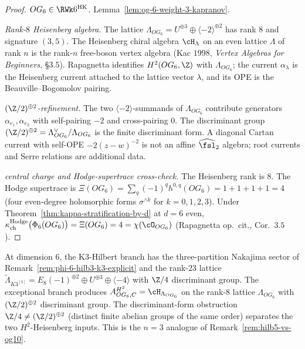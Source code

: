 \begin{proof}
\emph{\(OG_6\in\RWk6^{\mathrm{HK}}\).}
Lemma~\ref{lem:og-6-weight-3-kapranov}.

\emph{Rank-\(8\) Heisenberg algebra.}
The lattice $\Lambda_{OG_6} = U^{\oplus 3} \oplus
\langle -2\rangle^{\oplus 2}$ has rank $8$ and signature $(3, 5)$.
The Heisenberg chiral algebra $\cH_\Lambda$ on an even lattice
$\Lambda$ of rank $n$ is the rank-$n$ free-boson vertex algebra
\textup{(}Kac $1998$, \emph{Vertex Algebras for Beginners},
\S$3.5$\textup{).} Rapagnetta identifies \(H^2(OG_6,\Z)\) with
\(\Lambda_{OG_6}\); the current \(\alpha_\lambda\) is the Heisenberg
current attached to the lattice vector \(\lambda\), and its OPE is the
Beauville--Bogomolov pairing.

\emph{\((\Z/2)^{\oplus2}\)-refinement.}
The two $\langle -2\rangle$-summands of $\Lambda_{OG_6}$ contribute
generators $\alpha_{e_1}, \alpha_{e_2}$ with self-pairing $-2$ and
cross-pairing $0$. The discriminant group
$(\Z/2)^{\oplus 2} = \Lambda_{OG_6}^\vee / \Lambda_{OG_6}$ is the
finite discriminant form. A diagonal Cartan current with self-OPE
\(-2(z-w)^{-2}\) is not an affine \(\widehat{\fsl}_2\) algebra; root
currents and Serre relations are additional data.

\emph{central charge and Hodge-supertrace cross-check.}
The Heisenberg rank is \(8\). The Hodge supertrace is
$\Xi(OG_6) = \sum_q (-1)^q h^{0,q}(OG_6) = 1 + 1 + 1 + 1 = 4$
\textup{(}four even-degree holomorphic forms $\sigma^{\wedge k}$ for
$k = 0, 1, 2, 3$\textup{).} Under
Theorem~\ref{thm:kappa-stratification-by-d} at $d = 6$ even,
$\kappa_{\mathrm{ch}}^{\mathrm{Hodge}}\bigl(\Phi_6(OG_6)\bigr) = \Xi(OG_6) = 4 =
\chi(\cO_{OG_6})$ \textup{(}Rapagnetta op.\ cit., Cor.~$3.5$\textup{).}
\end{proof}

\begin{remark}
\label{rem:og6-vs-hilb3-k3}
%
At dimension \(6\), the K$3$-Hilbert branch has the three-partition
Nakajima sector of Remark~\ref{rem:phi-6-hilb3-k3-explicit} and the
rank-\(23\) lattice
$\widetilde\Lambda_{K3^{[3]}} = E_8(-1)^{\oplus 2} \oplus U^{\oplus 3}
\oplus \langle -4\rangle$ with $\Z/4$ discriminant group. The
exceptional branch produces
$A^{H^2}_{OG_6,C}=\cH_{\Lambda_{OG_6}}$ on the rank-$8$ lattice
$\Lambda_{OG_6}$ with $(\Z/2)^{\oplus 2}$ discriminant group. The
discriminant-form obstruction $\Z/4 \ne (\Z/2)^{\oplus 2}$
\textup{(}distinct finite abelian groups of the same order\textup{)}
separates the two \(H^2\)-Heisenberg inputs. This is the \(n=3\) analogue
of Remark~\ref{rem:hilb5-vs-og10}.
\end{remark}

